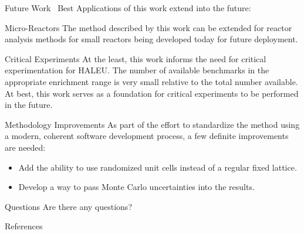 \documentclass[10pt,aspectratio=169]{beamer}              %
\begin{document}
\begin{frame}{Future Work \textendash\ Best}
    Applications of this work extend into the future:
    \begin{block}{Micro-Reactors}
        The method described by this work can be extended for reactor analysis methods for small reactors being developed today for future deployment.
    \end{block}
    \begin{block}{Critical Experiments}
        At the least, this work informs the need for critical experimentation for HALEU. The number of available benchmarks in the appropriate enrichment range is very small relative to the total number available. At best, this work serves as a foundation for critical experiments to be performed in the future.
    \end{block}
    \begin{block}{Methodology Improvements}
        As part of the effort to standardize the method using a modern, coherent software development process, a few definite improvements are needed:
        \begin{itemize}
            \item Add the ability to use randomized unit cells instead of a regular fixed lattice.
            \item Develop a way to pass Monte Carlo uncertainties into the results.
        \end{itemize}
    \end{block}
\end{frame}

\begin{frame}{Questions}
    Are there any questions?
\end{frame}

\begin{frame}[allowframebreaks]{References}
    \printbibliography
\end{frame}
\end{document}
